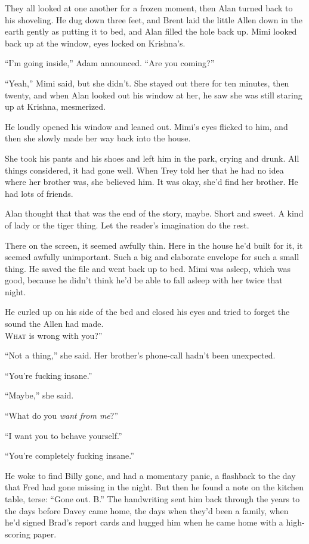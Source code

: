 \documentclass{article}
\begin{document}
They all looked at one another for a frozen moment, then Alan turned
back to his shoveling.  He dug down three feet, and Brent laid the
little Allen down in the earth gently as putting it to bed, and Alan
filled the hole back up.  Mimi looked back up at the window, eyes
locked on Krishna's.

``I'm going inside,'' Adam announced.  ``Are you coming?''

``Yeah,'' Mimi said, but she didn't.  She stayed out there for ten
minutes, then twenty, and when Alan looked out his window at her, he
saw she was still staring up at Krishna, mesmerized.

He loudly opened his window and leaned out.  Mimi's eyes flicked to
him, and then she slowly made her way back into the house.

She took his pants and his shoes and left him in the park, crying and
drunk.  All things considered, it had gone well.  When Trey told her
that he had no idea where her brother was, she believed him.  It was
okay, she'd find her brother.  He had lots of friends.

Alan thought that that was the end of the story, maybe.  Short and
sweet.  A kind of lady or the tiger thing.  Let the reader's
imagination do the rest.

There on the screen, it seemed awfully thin.  Here in the house he'd
built for it, it seemed awfully unimportant.  Such a big and elaborate
envelope for such a small thing.  He saved the file and went back up
to bed.  Mimi was asleep, which was good, because he didn't think he'd
be able to fall asleep with her twice that night.

He curled up on his side of the bed and closed his eyes and tried to
forget the sound the Allen had made.
\\
\lettrine[lines=3, lhang=.5, nindent=0pt, findent=2pt]{W}{hat}
is wrong with you?''

``Not a thing,'' she said.  Her brother's phone-call hadn't been
unexpected. 

``You're fucking insane.''

``Maybe,'' she said. 

``What do you \textit{want from me}?''

``I want you to behave yourself.''

``You're completely fucking insane.''

He woke to find Billy gone, and had a momentary panic, a flashback to
the day that Fred had gone missing in the night.  But then he found a
note on the kitchen table, terse:  ``Gone out.  B.'' The handwriting
sent him back through the years to the days before Davey came home,
the days when they'd been a family, when he'd signed Brad's report
cards and hugged him when he came home with a high-scoring paper.
\end{document}
